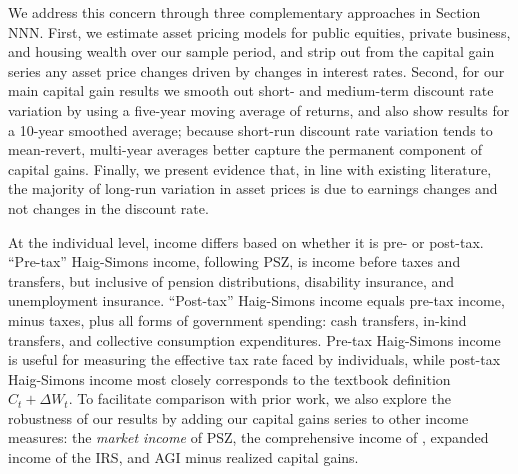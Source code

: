 We address this concern through three complementary approaches in Section NNN. First, we estimate asset pricing models for public equities, private business, and housing wealth over our sample period, and strip out from the capital gain series any asset price changes driven by changes in interest rates. Second, for our main capital gain results we smooth out short- and medium-term discount rate variation by using a five-year moving average of returns, and also show results for a 10-year smoothed average; because short-run discount rate variation tends to mean-revert, multi-year averages better capture the permanent component of capital gains. Finally, we present evidence that, in line with existing literature, the majority of long-run variation in asset prices is due to earnings changes and not changes in the discount rate.

At the individual level, income differs based on whether it is pre- or post-tax. ``Pre-tax'' Haig-Simons income, following PSZ, is income before taxes and transfers, but inclusive of pension distributions, disability insurance, and unemployment insurance. ``Post-tax'' Haig-Simons income equals pre-tax income, minus taxes, plus all forms of government spending: cash transfers, in-kind transfers, and collective consumption expenditures. Pre-tax Haig-Simons income is useful for measuring the effective tax rate faced by individuals, while post-tax Haig-Simons income most closely corresponds to the textbook definition $C_t + \Delta W_t$. To facilitate comparison with prior work, we also explore the robustness of our results by adding our capital gains series to other income measures: the \textit{market income} of PSZ, the comprehensive income of \citet{larrimore2021recent}, expanded income of the IRS, and AGI minus realized capital gains.
